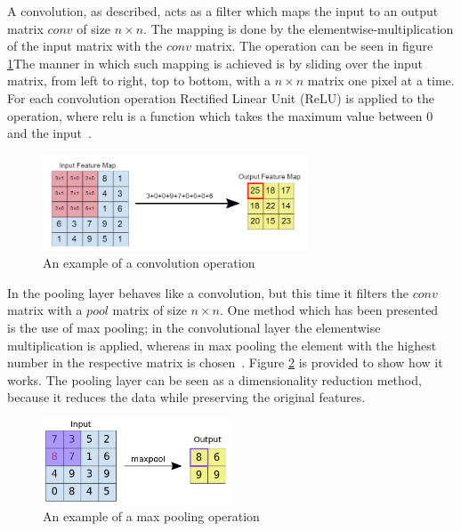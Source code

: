 A convolution, as described, acts as a filter which maps the input to an output matrix $conv$ of size $n \times n$. The mapping is done by the elementwise-multiplication of the input matrix with the $conv$ matrix. The operation can be seen in figure \ref{fig:convolution}The manner in which such mapping is achieved is by sliding over the input matrix, from left to right, top to bottom, with a $n \times n$ matrix one pixel at a time. For each convolution operation Rectified Linear Unit (ReLU) is applied to the operation, where \gls{relu} is a function which takes the maximum value between 0 and the input~\cite{google-cnn}.

\begin{figure}[htb!]
    \centering
    \includegraphics[width=0.7\textwidth]{figures/google-cnn-convolution-example.png}
    \caption{An example of a convolution operation~\cite{google-cnn}}
    \label{fig:convolution}
\end{figure}

In the pooling layer behaves like a convolution, but this time it filters the $conv$ matrix with a $pool$ matrix of size $n \times n$. One method which has been presented~\cite{google-cnn} is the use of max pooling; in the convolutional layer the elementwise multiplication is applied, whereas in max pooling the element with the highest number in the respective matrix is chosen~\cite{google-cnn}. Figure \ref{fig:maxpooling} is provided to show how it works. The pooling layer can be seen as a dimensionality reduction method, because it reduces the data while preserving the original features.

\begin{figure}[htb!]
    \centering
    \includegraphics[width=0.5\textwidth]{figures/google-cnn-maxpooling-example.png}
    \caption{An example of a max pooling operation~\cite{google-cnn}}
    \label{fig:maxpooling}
\end{figure}


